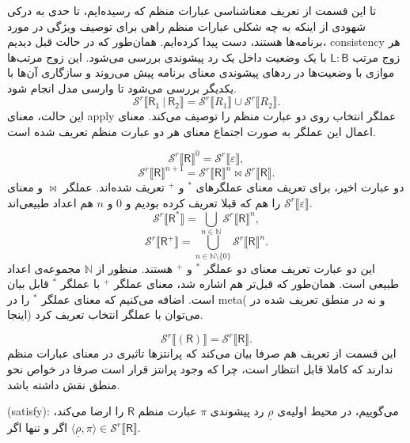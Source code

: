 \begin{defn}
تا این قسمت از تعریف معناشناسی عبارات منظم که رسیده‌ایم، تا حدی به درکی شهودی از اینکه به چه شکلی عبارات منظم راهی برای توصیف ویژگی‌ در مورد برنامه‌ها هستند، دست پیدا کرده‌ایم. همان‌طور که در حالت قبل دیدیم، \gls*{consistency} هر زوج مرتب
$\mathsf{L:B}$
با یک وضعیت داخل یک رد پیشوندی بررسی می‌‌شود. این زوج‌ مرتب‌ها موازی با وضعیت‌ها در ردهای پیشوندی معنای برنامه پیش می‌روند و سازگاری آن‌ها با یکدیگر بررسی می‌شود تا وارسی مدل انجام شود.
$$\mathcal{S}^r \llbracket\mathsf{R_1\:|\:R_2}\rrbracket= 
\mathcal{S}^r \llbracket R_1\rrbracket \cup
\mathcal{S}^r \llbracket R_2\rrbracket.$$
این حالت، معنای \gls*{apply} عملگر انتخاب روی دو عبارت منظم را توصیف می‌کند. معنای اعمال این عملگر به صورت اجتماع معنای هر دو عبارت منظم تعریف شده است.

$$\mathcal{S}^r \llbracket\mathsf{R}\rrbracket^0 = \mathcal{S}^r\llbracket\varepsilon\rrbracket,$$
$$\mathcal{S}^r \llbracket\mathsf{R}\rrbracket^{n+1} = \mathcal{S}^r \llbracket\mathsf{R}\rrbracket^{n} \Join
\mathcal{S}^r \llbracket\mathsf{R}\rrbracket.$$
دو عبارت اخیر، برای تعریف معنای عملگرهای $^*$ و $^+$ تعریف شده‌اند. عملگر $\Join$ و معنای 
$\mathcal{S}^r\llbracket\varepsilon\rrbracket$
را هم که قبلا تعریف کرده بودیم و $0$ و $n$ هم اعداد طبیعی‌اند.
$$\mathcal{S}^r\llbracket\mathsf{R^*}\rrbracket =  \bigcup_{n \in \mathbb{N}}
\mathcal{S}^r \llbracket\mathsf{R}\rrbracket^n,$$
$$\mathcal{S}^r\llbracket\mathsf{R^+}\rrbracket =  \bigcup_{n \in \mathbb{N}\setminus\{0\}}
\mathcal{S}^r \llbracket\mathsf{R}\rrbracket^n.$$
این دو عبارت تعریف معنای دو عملگر $^*$ و $^+$ هستند. منظور از $\mathbb{N}$ مجموعه‌ی اعداد طبیعی است. همان‌طور که قبل‌تر هم اشاره شد، معنای عملگر $^+$ با عملگر $^*$ قابل بیان است. اضافه می‌کنیم که معنای عملگر $^*$ را در \gls*{meta}( و نه در منطق تعریف شده در اینجا) می‌توان با عملگر انتخاب تعریف کرد.

$$\mathcal{S}^r \llbracket(\mathsf{R})\rrbracket=\mathcal{S}^r \llbracket\mathsf{R}\rrbracket.$$
این قسمت از تعریف هم صرفا بیان می‌کند که پرانتزها تاثیری در معنای عبارات منظم ندارند که کاملا قابل انتظار است، چرا که وجود پرانتز قرار است صرفا در خواص نحو منطق نقش داشته باشد.

\end{defn}

\begin{defn}
	(\gls*{satisfy}): می‌گوییم، در محیط اولیه‌ی $\underline{\rho}$ رد پیشوندی $\pi$ عبارت منظم $\mathsf{R}$ را ارضا می‌کند، اگر و تنها اگر 
	$\langle \underline{\rho},\pi \rangle \in \mathcal{S}^r \llbracket \mathsf{R} \rrbracket$. 
\end{defn}

